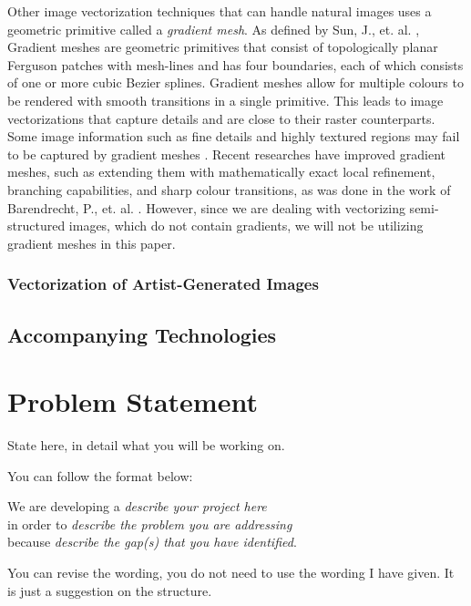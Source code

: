 \documentclass[12pt]{article}
\begin{document}
Other image vectorization techniques that can handle natural images uses a geometric primitive called a \textit{gradient mesh}. As defined by Sun, J., et. al. \cite{ImageVectorizationOptimizedGradientMeshes}, Gradient meshes are geometric primitives that consist of topologically planar Ferguson patches with mesh-lines and has four boundaries, each of which consists of one or more cubic Bezier splines. Gradient meshes allow for multiple colours to be rendered with smooth transitions in a single primitive. This leads to image vectorizations that capture details and are close to their raster counterparts. Some image information such as fine details and highly textured regions may fail to be captured by gradient meshes \cite{ImageVectorizationOptimizedGradientMeshes}. Recent researches have improved gradient meshes, such as extending them with mathematically exact local refinement, branching capabilities, and sharp colour transitions, as was done in the work of Barendrecht, P., et. al. \cite{barendrecht2018locally}. However, since we are dealing with vectorizing semi-structured images, which do not contain gradients, we will not be utilizing gradient meshes in this paper.

\subsubsection{Vectorization of Artist-Generated Images}

\subsection{Accompanying Technologies}


\section{Problem Statement}

State here, in detail what you will be working on.

You can follow the format below:

We are developing a {\it describe your project here}\\
in order to {\it describe the problem you are addressing}\\
because {\it describe the gap(s) that you have identified}.

You can revise the wording, you do not need to use the wording I have given. It is just a suggestion on the structure.
\end{document}
